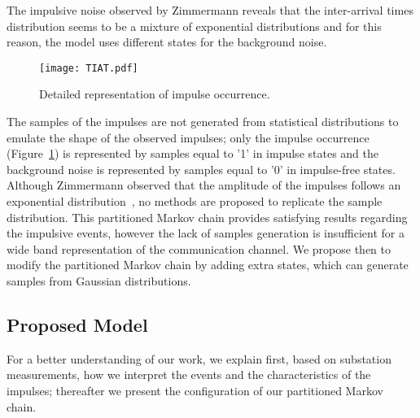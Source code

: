 \documentclass[journal]{IEEEtran}
\begin{document}
The impulsive noise observed by Zimmermann reveals that the inter-arrival times distribution seems to be a mixture of exponential distributions and for this reason, the model uses different states for the background noise.
\begin{figure}[h]
\begin{center}
  \texttt{[image: TIAT.pdf]}\\
\end{center}
  \caption{Detailed representation of impulse occurrence.}\label{TIAT}
\end{figure}
The samples of the impulses are not generated from statistical distributions to emulate the shape of the observed impulses; only the impulse occurrence (Figure~\ref{TIAT}) is represented by samples equal to '1' in impulse states and the background noise is represented by samples equal to '0' in impulse-free states. Although Zimmermann observed that the amplitude of the impulses follows an exponential distribution~\cite{zimmermann}, no methods are proposed to replicate the sample distribution. This partitioned Markov chain provides satisfying results regarding the impulsive events, however the lack of samples generation is insufficient for a wide band representation of the communication channel. We propose then to modify the partitioned Markov chain by adding extra states, which can generate samples from Gaussian distributions.
\subsection{Proposed Model}
For a better understanding of our work, we explain first, based on substation measurements, how we interpret the events and the characteristics of the impulses; thereafter we present the configuration of our partitioned Markov chain.\
\end{document}
